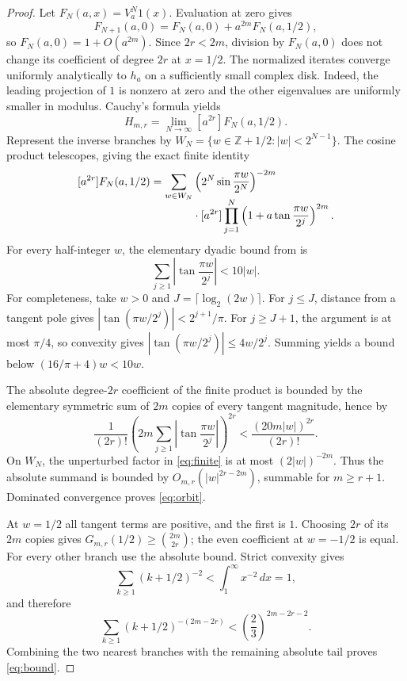 \documentclass[11pt,a4paper]{article}
\theoremstyle{remark}\newtheorem*{ednote}{Editorial note (ProveIt, 2026-10-01)}
\newcommand{\Z}{\mathbb Z}\newcommand{\E}{\mathcal E}
\begin{document}
\begin{proof}
Let $F_N(a,x)=V_a^N1(x)$. Evaluation at zero gives
\[
 F_{N+1}(a,0)=F_N(a,0)+a^{2m}F_N(a,1/2),
\]
so $F_N(a,0)=1+O(a^{2m})$. Since $2r<2m$, division by $F_N(a,0)$ does not change its coefficient of degree $2r$ at $x=1/2$. The normalized iterates converge uniformly analytically to $h_a$ on a sufficiently small complex disk. Indeed, the leading projection of $1$ is nonzero at zero and the other eigenvalues are uniformly smaller in modulus. Cauchy's formula yields
\[
 H_{m,r}=\lim_{N\to\infty}[a^{2r}]F_N(a,1/2).
\]
Represent the inverse branches by
$W_N=\{w\in\Z+1/2:|w|<2^{N-1}\}$. The cosine product telescopes, giving the exact finite identity
\begin{align}\label{eq:finite}
 [a^{2r}]F_N(a,1/2)
 =\sum_{w\in W_N}&\left(2^N\sin\frac{\pi w}{2^N}\right)^{-2m}\notag\\[-2mm]
 &\cdot[a^{2r}]\prod_{j=1}^N
       \left(1+a\tan\frac{\pi w}{2^j}\right)^{2m}.
\end{align}
For every half-integer $w$, the elementary dyadic bound from \cite{first} is
\begin{equation}\label{eq:tanbound}
 \sum_{j\ge1}\left|\tan\frac{\pi w}{2^j}\right|<10|w|.
\end{equation}
For completeness, take $w>0$ and $J=\lceil\log_2(2w)\rceil$. For $j\le J$, distance from a tangent pole gives $|\tan(\pi w/2^j)|<2^{j+1}/\pi$. For $j\ge J+1$, the argument is at most $\pi/4$, so convexity gives $|\tan(\pi w/2^j)|\le4w/2^j$. Summing yields a bound below $(16/\pi+4)w<10w$.

The absolute degree-$2r$ coefficient of the finite product is bounded by the elementary symmetric sum of $2m$ copies of every tangent magnitude, hence by
\[
 \frac{1}{(2r)!}
 \left(2m\sum_{j\ge1}\left|\tan\frac{\pi w}{2^j}\right|\right)^{2r}
 <\frac{(20m|w|)^{2r}}{(2r)!}.
\]
On $W_N$, the unperturbed factor in \eqref{eq:finite} is at most $(2|w|)^{-2m}$. Thus the absolute summand is bounded by $O_{m,r}(|w|^{2r-2m})$, summable for $m\ge r+1$. Dominated convergence proves \eqref{eq:orbit}.

At $w=1/2$ all tangent terms are positive, and the first is $1$. Choosing $2r$ of its $2m$ copies gives $G_{m,r}(1/2)\ge\binom{2m}{2r}$; the even coefficient at $w=-1/2$ is equal. For every other branch use the absolute bound. Strict convexity gives
\[
 \sum_{k\ge1}(k+1/2)^{-2}<\int_1^\infty x^{-2}\,dx=1,
\]
and therefore
\[
 \sum_{k\ge1}(k+1/2)^{-(2m-2r)}
 <\left(\frac23\right)^{2m-2r-2}.
\]
Combining the two nearest branches with the remaining absolute tail proves \eqref{eq:bound}.
\end{proof}
\end{document}
